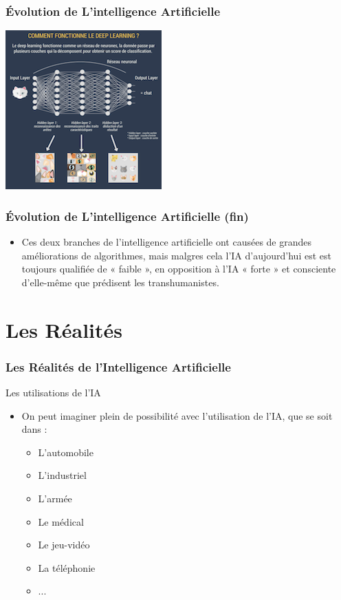\documentclass{beamer}
\begin{document}
	\begin{frame}
	\frametitle{Évolution de L'intelligence  Artificielle}
	
	\centerline{\includegraphics{deeplearning.png}}%
	
	\end{frame}
	
		\begin{frame}
	\frametitle{Évolution de L'intelligence  Artificielle (fin)}
	\begin{itemize}
		\item Ces deux branches de l'intelligence artificielle ont causées de grandes améliorations de algorithmes, mais malgres cela l'IA d'aujourd'hui est est toujours qualifiée de « faible », en opposition à l’IA « forte » et consciente d’elle-même que prédisent les transhumanistes.

	\end{itemize}
	\end{frame}
	
	
	\section{Les Réalités}
	\begin{frame}
	\frametitle{Les Réalités de l'Intelligence Artificielle}
	\begin{block}{Les utilisations de l'IA}
	\begin{itemize}
	\itemsep1em
		\item On peut imaginer plein de possibilité avec l'utilisation de l'IA, que se soit dans :
		\begin{itemize}
		\itemsep1em
		\item L'automobile
		\item L'industriel
		\item L'armée
		\item Le médical
		\item Le jeu-vidéo
		\item La téléphonie
		\item ...
		\end{itemize}
		\end{itemize}
	\end{block}
	\end{frame}
	
\end{document}

